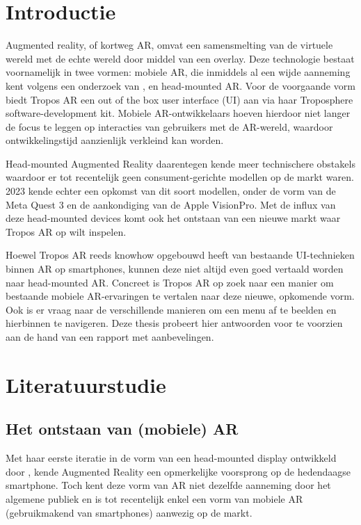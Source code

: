 
\section{Introductie}%
\label{sec:introductie}

Augmented reality, of kortweg AR, omvat een samensmelting van de virtuele wereld met de echte wereld door middel van een overlay.
Deze technologie bestaat voornamelijk in twee vormen: mobiele AR, die inmiddels al een wijde aanneming kent volgens een onderzoek van \textcite{Berggren2023}, en head-mounted AR.
Voor de voorgaande vorm biedt Tropos AR een out of the box user interface (UI) aan via haar Troposphere software-development kit.
Mobiele AR-ontwikkelaars hoeven hierdoor niet langer de focus te leggen op interacties van gebruikers met de AR-wereld, waardoor ontwikkelingstijd aanzienlijk verkleind kan worden.

Head-mounted Augmented Reality daarentegen kende meer technischere obstakels waardoor er tot recentelijk geen consument-gerichte modellen op de markt waren.
2023 kende echter een opkomst van dit soort modellen, onder de vorm van de Meta Quest 3 en de aankondiging van de Apple VisionPro.
Met de influx van deze head-mounted devices komt ook het ontstaan van een nieuwe markt waar Tropos AR op wilt inspelen.

Hoewel Tropos AR reeds knowhow opgebouwd heeft van bestaande UI-technieken binnen AR op smartphones, kunnen deze niet altijd even goed vertaald worden naar head-mounted AR.
Concreet is Tropos AR op zoek naar een manier om bestaande mobiele AR-ervaringen te vertalen naar deze nieuwe, opkomende vorm.
Ook is er vraag naar de verschillende manieren om een menu af te beelden en hierbinnen te navigeren.
Deze thesis probeert hier antwoorden voor te voorzien aan de hand van een rapport met aanbevelingen.


\section{Literatuurstudie}%
\label{sec:state-of-the-art}

\subsection{Het ontstaan van (mobiele) AR}
\label{subsec:wat-is-ar}
Met haar eerste iteratie in de vorm van een head-mounted display ontwikkeld door \textcite{Sutherland1968} , kende Augmented Reality een opmerkelijke voorsprong op de hedendaagse smartphone.
Toch kent deze vorm van AR niet dezelfde aanneming door het algemene publiek en is tot recentelijk enkel een vorm van mobiele AR (gebruikmakend van smartphones) aanwezig op de markt.

